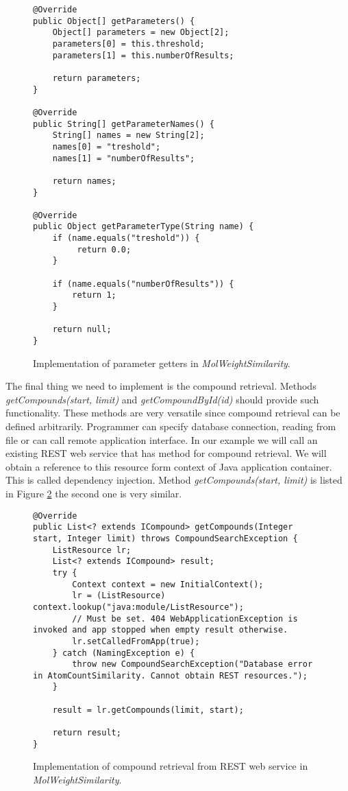 \documentclass[thesis=M,english]{FITthesis}[2012/10/20]
\begin{document}
\begin{figure}
\begin{lstlisting}
@Override
public Object[] getParameters() {
    Object[] parameters = new Object[2];
    parameters[0] = this.threshold;
    parameters[1] = this.numberOfResults;

    return parameters;
}

@Override
public String[] getParameterNames() {
    String[] names = new String[2];
    names[0] = "treshold";
    names[1] = "numberOfResults";

    return names;
}

@Override
public Object getParameterType(String name) {
    if (name.equals("treshold")) {
         return 0.0;
    }

    if (name.equals("numberOfResults")) {
        return 1;
    }

    return null;
}
\end{lstlisting}
\caption{Implementation of parameter getters in \textit{MolWeightSimilarity}.}
\label{MolWeightSimilarity4}
\end{figure}

The final thing we need to implement is the compound retrieval. Methods \textit{getCompounds(start, limit)} and \textit{getCompoundById(id)} should provide such functionality. These methods are very versatile since compound retrieval can be defined arbitrarily. Programmer can specify database connection, reading from file or can call remote application interface. In our example we will call an existing REST web service that has method for compound retrieval. We will obtain a reference to this resource form context of Java application container. This is called dependency injection. Method \textit{getCompounds(start, limit)} is listed in Figure \ref{MolWeightSimilarity5} the second one is very similar.

\begin{figure}
\begin{lstlisting}
@Override
public List<? extends ICompound> getCompounds(Integer start, Integer limit) throws CompoundSearchException {
    ListResource lr;
    List<? extends ICompound> result;
    try {
        Context context = new InitialContext();
        lr = (ListResource) context.lookup("java:module/ListResource");
        // Must be set. 404 WebApplicationException is invoked and app stopped when empty result otherwise.
        lr.setCalledFromApp(true);
    } catch (NamingException e) {
        throw new CompoundSearchException("Database error in AtomCountSimilarity. Cannot obtain REST resources.");
    }

    result = lr.getCompounds(limit, start);

    return result;
}
\end{lstlisting}
\caption{Implementation of compound retrieval from REST web service in \textit{MolWeightSimilarity}.}
\label{MolWeightSimilarity5}
\end{figure}
\end{document}
